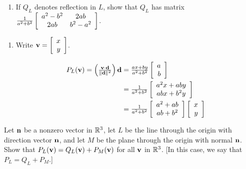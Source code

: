 \begin{multicols}{2}
\begin{ex}
\begin{enumerate}[label={\alph*.}]
\item If $Q_{L}$ denotes reflection in $L$, show that $Q_{L}$ has matrix $\tfrac{1}{a^2 + b^2}\left[
\begin{array}{cc}
a^2 - b^2 & 2ab\\
2ab & b^2 - a^2\\
\end{array}\right]$.

\end{enumerate}
\begin{sol}
\begin{enumerate}[label={\alph*.}]
\item  Write $\textbf{v} = \left[
\begin{array}{r}
x\\
y
\end{array}
\right]$.

\begin{align*}
P_{L}(\textbf{v}) = \left(\tfrac{\textbf{v} \cdot \textbf{d}}{\| \textbf{d} \|^2}\right)\textbf{d} & = \tfrac{ax + by}{a^2 + b^2}\left[
\begin{array}{r}
a\\
b
\end{array}
\right]  \\
&  = \tfrac{1}{a^2 + b^2}\left[
\begin{array}{c}
a^2x + aby\\
abx + b^2y
\end{array}
\right] \\
& = \tfrac{1}{a^2 + b^2}\left[
\begin{array}{c}
a^2 + ab\\
ab + b^2
\end{array}
\right] \left[
\begin{array}{r}
x\\
y
\end{array}
\right]
\end{align*}

\end{enumerate}
\end{sol}
\end{ex}

\begin{ex}
Let $\textbf{n}$ be a nonzero vector in $\mathbb{R}^3$, let $L$ be the line through the origin with direction vector $\textbf{n}$, and let $M$ be the plane through the origin with normal $\textbf{n}$. Show that $P_{L}(\textbf{v}) = Q_{L}(\textbf{v}) + P_{M}(\textbf{v})$ for all $\textbf{v}$ in $\mathbb{R}^3$. [In this case, we say that $P_{L} = Q_{L} + P_{M}$.]
\end{ex}


\end{multicols}
